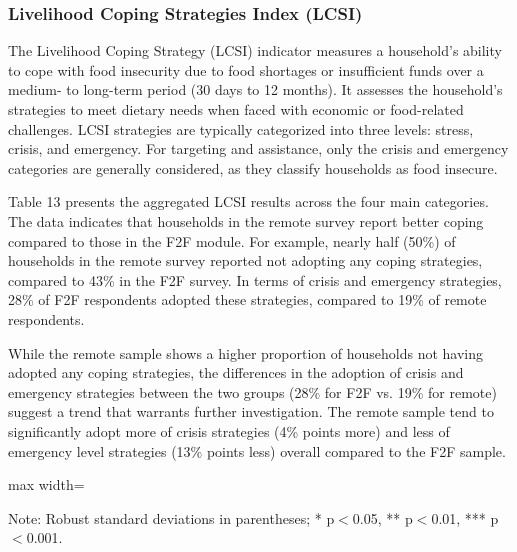 \documentclass[11pt,harvard]{article}
\begin{document}
	
	\subsubsection{Livelihood Coping Strategies Index (LCSI)}
	
The Livelihood Coping Strategy (LCSI) indicator measures a household's ability to cope with food insecurity due to food shortages or insufficient funds over a medium- to long-term period (30 days to 12 months). It assesses the household's strategies to meet dietary needs when faced with economic or food-related challenges. LCSI strategies are typically categorized into three levels: stress, crisis, and emergency. For targeting and assistance, only the crisis and emergency categories are generally considered, as they classify households as food insecure.

Table 13 presents the aggregated LCSI results across the four main categories. The data indicates that households in the remote survey report better coping compared to those in the F2F module. For example, nearly half (50\%) of households in the remote survey reported not adopting any coping strategies, compared to 43\% in the F2F survey. In terms of crisis and emergency strategies, 28\% of F2F respondents adopted these strategies, compared to 19\% of remote respondents.

While the remote sample shows a higher proportion of households not having adopted any coping strategies, the differences in the adoption of crisis and emergency strategies between the two groups (28\% for F2F vs. 19\% for remote) suggest a trend that warrants further investigation. The remote sample tend to significantly adopt more of crisis strategies (4\% points more) and less of emergency level strategies (13\% points less) overall compared to the F2F sample.
	
	\begin{table}[htbp]
		\centering
		\begin{adjustbox}{max width=\textwidth}
			\begin{threeparttable}
				\caption{Impact of Survey Modality on Livelihood Coping Strategy}
				\scriptsize%
				 
				\label{tab:LCS_Modality_BF}
				\begin{tablenotes}
					\item Note: Robust standard deviations in parentheses; * p$<$0.05, ** p$<$0.01, *** p$<$0.001. 
				\end{tablenotes}
			\end{threeparttable}
		\end{adjustbox}
	\end{table}
	
\end{document}
